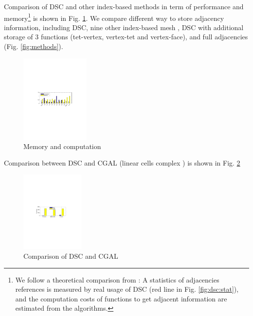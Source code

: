 \documentclass{scrartcl}
\begin{document}
Comparison of DSC and other index-based methods in term of performance and memory\footnote{We follow a theoretical comparison from \cite{Garimella2002}: A statistics of adjacencies references is measured by real usage of DSC (red line in Fig. \ref{fig:dsc:stat}), and the computation costs of functions to get adjacent information are estimated from the algorithms.}
is shown in Fig. \ref{fig:index:compare}. We compare different way to store adjacency information, including DSC, nine other index-based mesh \cite{Garimella2002}, DSC with additional storage of 3 functions (tet-vertex, vertex-tet and vertex-face), and full adjacencies (Fig. \ref{fig:methods}).


\begin{figure}[!htb]
	\centering
	\includegraphics[height=12em]{../compute_mem}
	\caption{Memory and computation}
	\label{fig:index:compare}
\end{figure}



Comparison between DSC and CGAL (linear cells complex \cite{CGAL}) is shown in Fig. \ref{fig:compare:cellcomplex}


\begin{figure}[!htb]
	\centering
	\includegraphics[height=11em]{../dsc_cgal}
	\caption{Comparison of DSC and CGAL}
	\label{fig:compare:cellcomplex}
\end{figure}
\end{document}
